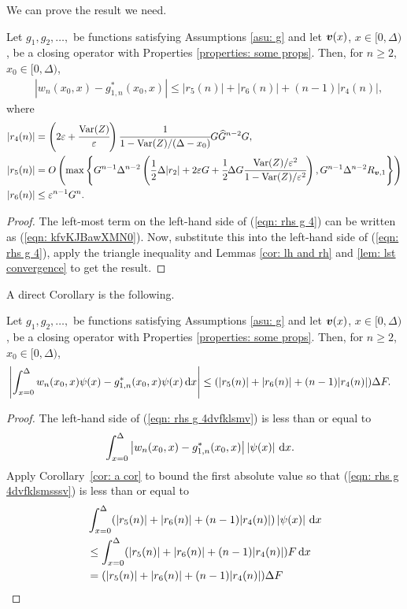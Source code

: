 We can prove the result we need. 
\begin{cor}\label{cor: a cor}
	Let \(g_1,g_2,\dots,\) be functions satisfying Assumptions \ref{asu: g} and let \({\boldsymbol v}(x)\), \(x\in[0,\Delta)\), be a closing operator with Properties \ref{properties: some props}. Then, for \(n\geq 2\), \(x_0\in[0,\Delta)\), 
	\begin{align}
		&\left|w_n(x_0,x)- g_{1,n}^{*}(x_0,x) \right|
		\leq |r_5(n)| + |r_6(n)| + (n-1)|r_4(n)|, \label{eqn: rhs g 4}
	\end{align}
	where 
	\begin{align*}
		|r_4(n)| &= \left(2\varepsilon + \cfrac{\mathrm{Var}(Z)}{\varepsilon}\right) \cfrac{1}{1-\mathrm{Var}(Z)/(\Delta-x_0)} G \widehat G^{n-2} G ,
		\\|r_5(n)|&= O\left(\max\left\{G^{n-1}\Delta^{n-2}\left(\frac{1}{2}\Delta|r_2 |+ 2\varepsilon G 
		+ \cfrac{1}{2}\Delta G\cfrac{\mathrm{Var}(Z)/\varepsilon^2}{1-\mathrm{Var}(Z)/\varepsilon^2}\right),
		G^{n-1}\Delta^{n-2}R_{{\boldsymbol v},1}\right\}\right)
		\\|r_6(n)| &\leq\varepsilon^{n-1}G^n.
	\end{align*}
\end{cor}
\begin{proof}
	The left-most term on the left-hand side of (\ref{eqn: rhs g 4}) can be written as (\ref{eqn: kfvKJBawXMN0}). Now, substitute this into the left-hand side of (\ref{eqn: rhs g 4}), apply the triangle inequality and Lemmas \ref{cor: lh and rh} and \ref{lem: lst convergence} to get the result.  
\end{proof}

A direct Corollary is the following.
\begin{cor}
	 Let \(g_1,g_2,\dots,\) be functions satisfying Assumptions \ref{asu: g} and let \({\boldsymbol v}(x)\), \(x\in[0,\Delta)\), be a closing operator with Properties \ref{properties: some props}. Then, for \(n\geq 2\), \(x_0\in[0,\Delta)\), 
	\begin{align}
		&\left| \int_{x=0}^\Delta w_n(x_0,x) \psi(x)-g_{1,n}^*(x_0,x)\psi(x)\, \mathrm{d} x\right|  
		\leq (|r_5(n)| + |r_6(n)| + (n-1)|r_4(n)|)\Delta F. \label{eqn: rhs g 4dvfklsmv}
	\end{align}
\end{cor}
\begin{proof}
	The left-hand side of (\ref{eqn: rhs g 4dvfklsmv}) is less than or equal to 
	\begin{align}
		&\int_{x=0}^\Delta \left| w_n(x_0,x) 
		{}- g_{1,n}^*(x_0,x)\right| \left|\psi(x)\right| \, \mathrm{d} x. \label{eqn: rhs g 4dvfklsmsssv}
	\end{align}
	Apply Corollary~\ref{cor: a cor} to bound the first absolute value so that (\ref{eqn: rhs g 4dvfklsmsssv}) is less than or equal to 
	\begin{align}
		&\int_{x=0}^\Delta (|r_5(n)| + |r_6(n)| + (n-1)|r_4(n)|) \left|\psi(x)\right| \, \mathrm{d} x \nonumber
		\\&\leq \int_{x=0}^\Delta(|r_5(n)| + |r_6(n)| + (n-1)|r_4(n)|) F \, \mathrm{d} x \nonumber 
		\\&= (|r_5(n)| + |r_6(n)| + (n-1)|r_4(n)|)\Delta F 
	\end{align}
\end{proof}


